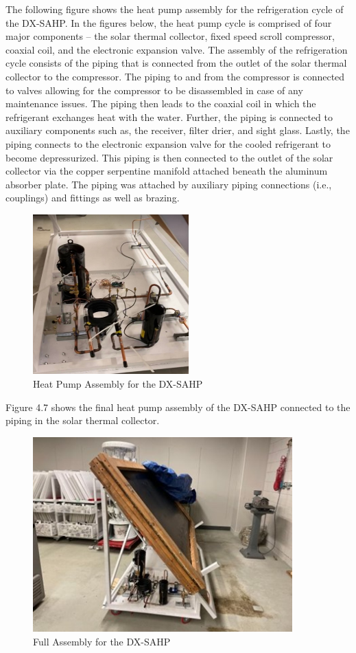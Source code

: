 \medskip
The following figure shows the heat pump assembly for the refrigeration cycle of the DX-SAHP. In the figures below, the heat pump cycle is comprised of four major components – the solar thermal collector, fixed speed scroll compressor, coaxial coil, and the electronic expansion valve. The assembly of the refrigeration cycle consists of the piping that is connected from the outlet of the solar thermal collector to the compressor. The piping to and from the compressor is connected to valves allowing for the compressor to be disassembled in case of any maintenance issues. The piping then leads to the coaxial coil in which the refrigerant exchanges heat with the water. Further, the piping is connected to auxiliary components such as, the receiver, filter drier, and sight glass. Lastly, the piping connects to the electronic expansion valve for the cooled refrigerant to become depressurized. This piping is then connected to the outlet of the solar collector via the copper serpentine manifold attached beneath the aluminum absorber plate. The piping was attached by auxiliary piping connections (i.e., couplings) and fittings as well as brazing.

\medskip
\begin{figure}[H]
    \centering
    \includegraphics[width=6cm]{images/heat_pump_assembly.png}
    \caption{Heat Pump Assembly for the DX-SAHP}
\end{figure}

Figure 4.7 shows the final heat pump assembly of the DX-SAHP connected to the piping in the solar thermal collector.

\medskip
\begin{figure}[H]
    \centering
    \includegraphics[width=10cm]{images/assembly.jpg}
    \caption{Full Assembly for the DX-SAHP}
\end{figure}


